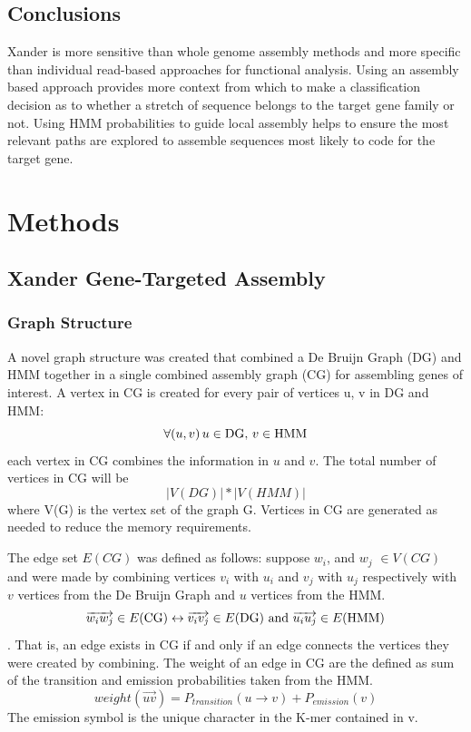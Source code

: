 \documentclass[10pt]{bmc_article}
\newenvironment{bmcformat}{\begin{raggedright}\baselineskip20pt\sloppy\setboolean{publ}{false}}{\end{raggedright}\baselineskip20pt\sloppy}
\begin{document}
\begin{bmcformat}
\subsection*{Conclusions}
Xander is more sensitive than whole genome assembly methods and more specific than individual read-based approaches for functional analysis.  Using an assembly based approach provides more context from which to make a classification decision as to whether a stretch of sequence belongs to the target gene family or not.  Using HMM probabilities to guide local assembly helps to ensure the most relevant paths are explored to assemble sequences most likely to code for the target gene.
  
\section*{Methods}
\subsection*{Xander Gene-Targeted Assembly}
\subsubsection*{Graph Structure}
A novel graph structure was created that combined a De Bruijn Graph (DG) and HMM together in a single combined assembly graph (CG) for assembling genes of interest.  A vertex in CG is created for every pair of vertices u, v in DG and HMM:
\[ \forall (u,v)\, u\in \textnormal{DG, }v\in \textnormal{HMM} \] each vertex in CG combines the information in $u$ and $v$.
The total number of vertices in CG will be \[|V(DG)| * |V(HMM)|\] where V(G) is the vertex set of the graph G.  Vertices in CG are generated as needed to reduce the memory requirements.

The edge set $E(CG)$ was defined as follows: suppose $w_i$, and $w_j$ \(\in V(CG) \) and were made by combining vertices $v_i$ with $u_i$ and $v_j$ with $u_j$ respectively with $v$ vertices from the De Bruijn Graph and $u$ vertices from the HMM.
\[\overrightarrow{w_iw_j} \in E(\textnormal{CG}) \leftrightarrow \overrightarrow{v_iv_j} \in E(\textnormal{DG})\textnormal{ and } \overrightarrow{u_iu_j} \in E(\textnormal{HMM})\].
That is, an edge exists in CG if and only if an edge connects the vertices they were created by combining. The weight of an edge  in CG are the defined as sum of the transition and emission probabilities taken from the HMM.  
\[ weight(\overrightarrow{uv}) = P_{transition}(u \rightarrow v) + P_{emission}(v) \]
The emission symbol is the unique character in the K-mer contained in v.


\end{bmcformat}
\end{document}
